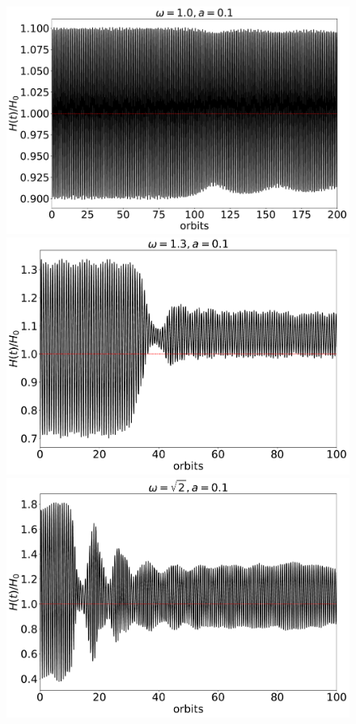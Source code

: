\documentclass[fleqn,usenatbib]{mnras}
\begin{document}
\begin{figure}
\centering
\includegraphics[scale=0.16]{Figures/figure00PRODUCTION_VSTRHYDRORes32Re4687H6ForcedBouncezBCReflectiveLx4Hw1pt0a0pt1_timeevolution_dynamicalH.pdf}
\includegraphics[scale=0.16]{Figures/figure00PRODUCTION_VSTRHYDRORes32Re4687H6ForcedBouncezBCReflectiveLx8Hw1pt3a0pt1InitialH0pt7_timeevolution_dynamicalH.pdf}
\includegraphics[scale=0.16]{Figures/figure00PRODUCTION_VSTRHYDRORes32Re4687H6ForcedBouncezBCReflectiveLx8Hw1pt41a0pt1_timeevolution_dynamicalH.pdf}

\end{figure}
\end{document}
